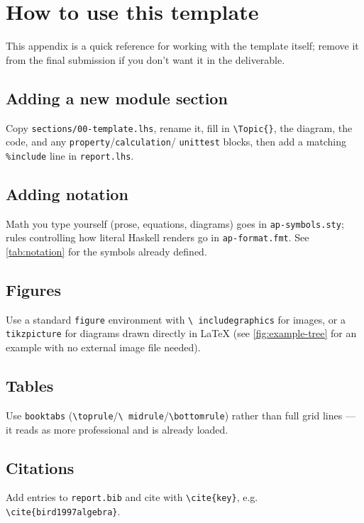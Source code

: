 \section{How to use this template}
\label{app:howto}

This appendix is a quick reference for working with the template itself;
remove it from the final submission if you don't want it in the deliverable.

\subsection*{Adding a new module section}
Copy \texttt{sections/00-template.lhs}, rename it, fill in \verb|\Topic{}|,
the diagram, the code, and any \texttt{property}/\texttt{calculation}/
\texttt{unittest} blocks, then add a matching \texttt{\%include} line in
\texttt{report.lhs}.

\subsection*{Adding notation}
Math you type yourself (prose, equations, diagrams) goes in
\texttt{ap-symbols.sty}; rules controlling how literal Haskell renders go in
\texttt{ap-format.fmt}. See \autoref{tab:notation} for the symbols already
defined.

\subsection*{Figures}
Use a standard \texttt{figure} environment with \texttt{\textbackslash
includegraphics} for images, or a \texttt{tikzpicture} for diagrams drawn
directly in LaTeX (see \autoref{fig:example-tree} for an example with no
external image file needed).

\subsection*{Tables}
Use \texttt{booktabs} (\texttt{\textbackslash toprule}/\texttt{\textbackslash
midrule}/\texttt{\textbackslash bottomrule}) rather than full grid lines —
it reads as more professional and is already loaded.

\subsection*{Citations}
Add entries to \texttt{report.bib} and cite with \verb|\cite{key}|, e.g.
\verb|\cite{bird1997algebra}|.


